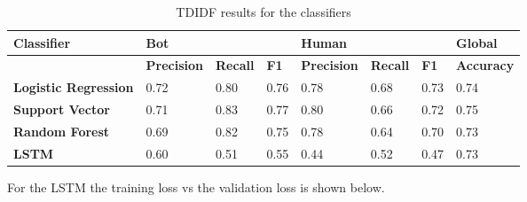\documentclass[12pt]{article}
\begin{document}
\begin{table}[ht]
\begin{tabular}{|l|lll|lll|l|}
\hline
\textbf{Classifier}          & \multicolumn{3}{l|}{\textbf{Bot}}                                                          & \multicolumn{3}{l|}{\textbf{Human}}                                                            & \textbf{Global}   \\ \hline
\textbf{}                    & \multicolumn{1}{l|}{\textbf{Precision}} & \multicolumn{1}{l|}{\textbf{Recall}} & \textbf{F1} & \multicolumn{1}{l|}{\textbf{Precision}} & \multicolumn{1}{l|}{\textbf{Recall}} & \textbf{F1} & \textbf{Accuracy} \\ \hline
\textbf{Logistic Regression} & \multicolumn{1}{l|}{0.72}               & \multicolumn{1}{l|}{0.80}            & 0.76        & \multicolumn{1}{l|}{0.78}               & \multicolumn{1}{l|}{0.68}            & 0.73        & 0.74              \\ \hline
\textbf{Support Vector}      & \multicolumn{1}{l|}{0.71}               & \multicolumn{1}{l|}{0.83}            & 0.77        & \multicolumn{1}{l|}{0.80}               & \multicolumn{1}{l|}{0.66}            & 0.72        & 0.75              \\ \hline
\textbf{Random Forest}       & \multicolumn{1}{l|}{0.69}               & \multicolumn{1}{l|}{0.82}            & 0.75        & \multicolumn{1}{l|}{0.78}               & \multicolumn{1}{l|}{0.64}            & 0.70        & 0.73              \\ \hline
\textbf{LSTM}                & \multicolumn{1}{l|}{0.60}                   & \multicolumn{1}{l|}{0.51}                & 0.55            & \multicolumn{1}{l|}{0.44}                   & \multicolumn{1}{l|}{0.52}                &0.47             & 0.73             \\ \hline
\end{tabular}
\caption{TDIDF results for the classifiers}
\label{table:tdidf}
\end{table}
 For the LSTM the training loss vs the validation loss is shown below.
\end{document}
